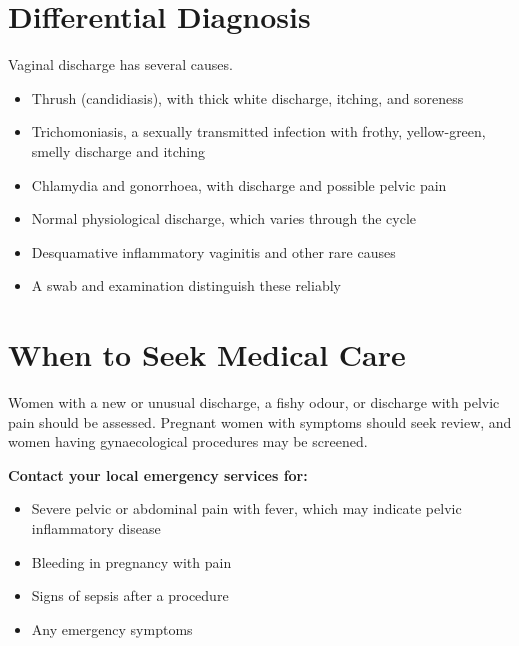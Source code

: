\section*{Differential Diagnosis}
Vaginal discharge has several causes.
\begin{itemize}
    \item Thrush (candidiasis), with thick white discharge, itching, and soreness
    \item Trichomoniasis, a sexually transmitted infection with frothy, yellow-green, smelly discharge and itching
    \item Chlamydia and gonorrhoea, with discharge and possible pelvic pain
    \item Normal physiological discharge, which varies through the cycle
    \item Desquamative inflammatory vaginitis and other rare causes
    \item A swab and examination distinguish these reliably
\end{itemize}

\section*{When to Seek Medical Care}
Women with a new or unusual discharge, a fishy odour, or discharge with pelvic pain should be assessed. Pregnant women with symptoms should seek review, and women having gynaecological procedures may be screened.

\textbf{Contact your local emergency services for:}
\begin{itemize}
    \item Severe pelvic or abdominal pain with fever, which may indicate pelvic inflammatory disease
    \item Bleeding in pregnancy with pain
    \item Signs of sepsis after a procedure
    \item Any emergency symptoms
\end{itemize}

